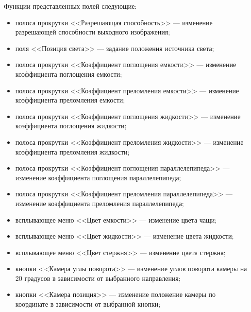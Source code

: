 \begin{figure}[ht!]
\end{figure}

Функции представленных полей следующие:
\begin{itemize}
	\item полоса прокрутки <<Разрешающая способность>> --- изменение разрешающей способности выходного изображения;
	\item поля <<Позиция света>> --- задание положения источника света;
	\item полоса прокрутки <<Коэффициент поглощения емкости>> --- изменение коэффициента поглощения емкости;
	\item полоса прокрутки <<Коэффициент преломления емкости>> --- изменение коэффициента преломления емкости;
	\item полоса прокрутки <<Коэффициент поглощения жидкости>> --- изменение коэффициента поглощения жидкости;
	\item полоса прокрутки <<Коэффициент преломления жидкости>> --- изменение коэффициента преломления жидкости;
	\item полоса прокрутки <<Коэффициент поглощения параллелепипеда>> --- изменение коэффициента поглощения параллелепипеда;
	\item полоса прокрутки <<Коэффициент преломления параллелепипеда>> --- изменение коэффициента преломления параллелепипеда;
	\item всплывающее меню <<Цвет емкости>> --- изменение цвета чащи;
	\item всплывающее меню <<Цвет жидкости>> --- изменение цвета жидкости;
	\item всплывающее меню <<Цвет стержня>> --- изменение цвета стержня;
	\item кнопки <<Камера углы поворота>> --- изменение углов поворота камеры на 20 градусов в зависимости от выбранного направления;
	\item кнопки <<Камера позиция>> --- изменение положение камеры по координате в зависимости от выбранной кнопки;

\end{itemize}
